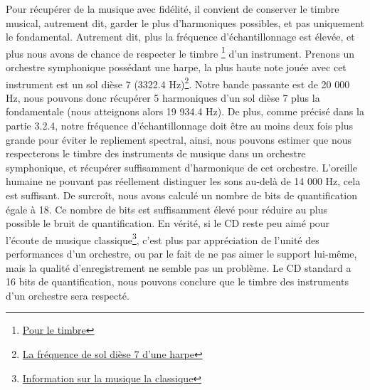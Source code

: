 Pour récupérer de la musique avec fidélité, il convient de conserver le timbre musical, autrement dit, garder le plus d'harmoniques possibles, et pas uniquement le fondamental. Autrement dit, plus la fréquence d'échantillonnage est élevée, et plus nous avons de chance de respecter le timbre \footnote{\href{https://fr.wikipedia.org/wiki/Gain_d\%C3\%A9cibel}{Pour le timbre}} d'un instrument. Prenons un orchestre symphonique possédant une harpe, la plus haute note jouée avec cet instrument est un sol dièse 7 (3322.4 Hz)\footnote{\href{http://hyperphysics.phy-astr.gsu.edu/hbase/Music/orchins.html}{La fréquence de sol dièse 7 d'une harpe}}. Notre bande passante est de 20 000 Hz, nous pouvons donc récupérer 5 harmoniques d'un sol dièse 7 plus la fondamentale (nous atteignons alors 19 934.4 Hz). De plus, comme précisé dans la partie 3.2.4, notre fréquence d'échantillonnage doit être au moins deux fois plus grande pour éviter le repliement spectral, ainsi, nous pouvons estimer que nous respecterons le timbre des instruments de musique dans un orchestre symphonique, et récupérer suffisamment d'harmonique de cet orchestre. L'oreille humaine ne pouvant pas réellement distinguer les sons au-delà de 14 000 Hz, cela est suffisant. De surcroît, nous avons calculé un nombre de bits de quantification égale à 18. Ce nombre de bits est suffisamment élevé pour réduire au plus possible le bruit de quantification. En vérité, si le CD reste peu aimé pour l'écoute de musique classique\footnote{\href{https://www.radiofrance.fr/franceculture/podcasts/hashtag/la-musique-classique-peut-elle-encore-resister-a-la-dematerialisation-7501004}{Information sur la musique la classique}}, c'est plus par appréciation de l'unité des performances d'un orchestre, ou par le fait de ne pas aimer le support  lui-même, mais la qualité d'enregistrement ne semble pas un problème. Le CD standard a 16 bits de quantification, nous pouvons conclure que le timbre des instruments d'un orchestre sera respecté.

